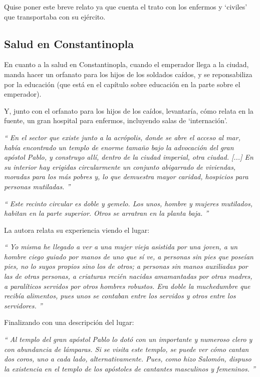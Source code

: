 Quise poner este breve relato ya que cuenta el trato con los enfermos
y `civiles' que transportaba con su ejército.

\subsection{Salud en Constantinopla}

En cuanto a la salud en Constantinopla, cuando el emperador llega
a la ciudad, manda hacer un orfanato para los hijos de los soldados
caídos, y se reponsabiliza por la educación (que está en el capítulo
sobre educación en la parte sobre el emperador).

Y, junto con el orfanato para los hijos de los caídos, levantaría,
cómo relata en la fuente, un gran hospital para enfermos, incluyendo
salas de `internación'.

\textit{``
	En el sector que existe junto a la acrópolis, donde se abre
	el acceso al mar, había encontrado un templo de enorme tamaño
	bajo la advocación del gran apóstol Pablo, y construyo allí,
	dentro de la ciudad imperial, otra ciudad. [...] En su interior
	hay erigidas circularmente un conjunto abigarrado de viviendas,
	moradas para los más pobres y, lo que demuestra mayor caridad,
	hospicios para personas mutiladas.
	''}

\textit{``
	Este recinto circular es doble y gemelo. Los unos, hombre y
	mujeres mutilados, habitan en la parte superior. Otros se arratran
	en la planta baja.
	''}

La autora relata su experiencia viendo el lugar:

\textit{``
	Yo misma he llegado a ver a una mujer vieja asistida por una
	joven, a un hombre ciego guiado por manos de uno que sí ve,
	a personas sin pies que poseían pies, no lo suyos propios
	sino los de otros; a personas sin manos auxiliadas por las de
	otras personas, a criaturas recién nacidas amamantadas por otras
	madres, a paralíticos servidos por otros hombres robustos.
	Era doble la muchedumbre que recibía alimentos, pues unos se
	contaban entre los servidos y otros entre los servidores.
	''}

Finalizando con una descripción del lugar:

\textit{``
	Al templo del gran apóstol Pablo lo dotó con un importante y
	numeroso clero y con abundancia de lámparas. Si se visita este
	templo, se puede ver cómo cantan dos coros, uno a cada lado,
	alternativamente. Pues, como hizo Salomón, dispuso la existencia
	en el templo de los apóstoles de cantantes masculinos y femeninos.
	''}
































